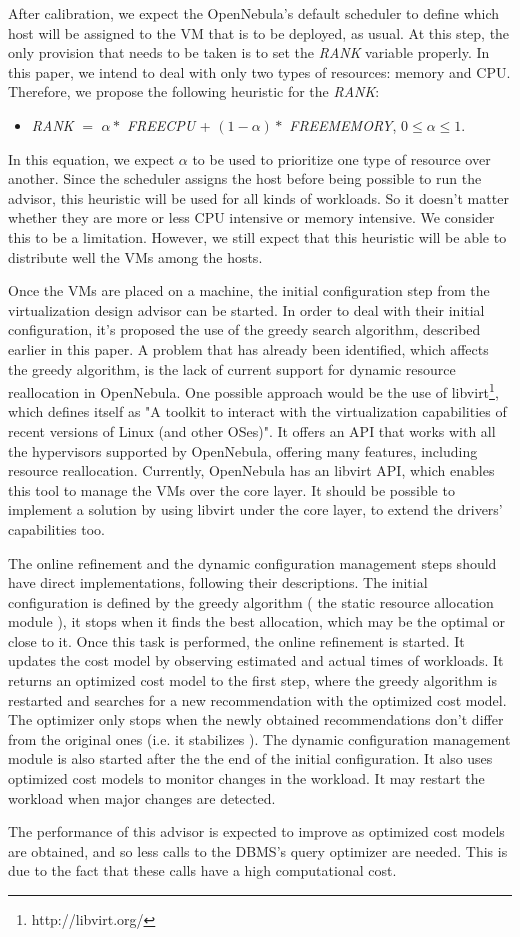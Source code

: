 After calibration, we expect the OpenNebula's default scheduler to define which host will be assigned to the VM that is to be deployed, as usual. At this step, the only provision that needs to be taken is to set the \textit{RANK} variable properly. In this paper, we intend to deal with only two types of resources: memory and CPU. Therefore, we propose the following heuristic for the \textit{RANK}:
\begin{itemize}
 \item \textit{RANK} $=$ $\alpha *$ \textit{FREECPU} + $ (1 -\alpha) *$ \textit{FREEMEMORY}, $  0 \le \alpha \le 1  $.
\end{itemize}
In this equation, we expect $\alpha$ to be used to prioritize one type of resource over another. Since the scheduler assigns the host before being possible to run the advisor, this heuristic will be used for all kinds of workloads. So it doesn't matter whether they are more or less CPU intensive or memory intensive. We consider this to be a limitation. However, we still expect that this heuristic will be able to  distribute well the VMs among the hosts.

Once the VMs are placed on a machine, the initial configuration step from the virtualization design advisor can be started. In order to deal with their initial configuration, it's proposed the use of the greedy search algorithm, described earlier in this paper. A problem that has already been identified, which affects the greedy algorithm, is the lack of current support for dynamic resource reallocation in OpenNebula. One possible approach would be the use of libvirt\footnote{http://libvirt.org/}, which defines itself as "A toolkit to interact with the virtualization capabilities of recent versions of Linux (and other OSes)". It offers an API that works with all the hypervisors supported by OpenNebula, offering many features, including resource reallocation. Currently, OpenNebula has an libvirt API, which enables this tool to manage the VMs over the core layer. It should be possible to implement a solution by using libvirt under the core layer, to extend the drivers' capabilities too.

The online refinement and the dynamic configuration management steps should have direct implementations, following their descriptions. The initial configuration is defined by the greedy algorithm ( the static resource allocation module ), it stops when it finds the best allocation, which may be the optimal or close to it. Once this task is performed, the online refinement is started. It updates the cost model by observing estimated and actual times of workloads.  It returns an optimized cost model to the first step, where the greedy algorithm is restarted and searches for a new recommendation with the optimized cost model. The optimizer only stops when the newly obtained recommendations don't differ from the original ones (i.e. it stabilizes ). The dynamic configuration management module is also started after the the end of the initial configuration. It also uses optimized cost models to monitor changes in the workload. It may restart the workload when major changes are detected.

The performance of this advisor is expected to improve as optimized cost models are obtained, and so less calls to the DBMS's query optimizer are needed. This is due to the fact that these calls have a high computational cost.


